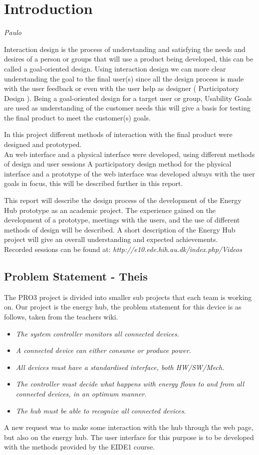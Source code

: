 \chapter{Introduction}

\textit{Paulo}

Interaction design is the process of understanding and satisfying the needs and desires of a person or groups that will use a product being developed, this can be called a goal-oriented design. Using interaction design we can more clear understanding the goal to the final user(s) since all the design process is made with the user feedback or even with the user help as designer ( Participatory Design ). Being a goal-oriented design for a target user or group, Usability Goals are used as understanding of the customer needs this will give a basis for testing the final product to meet the customer(s) goals.

In this project different methods of interaction with the final product were designed and prototyped.\\
An web interface and a physical interface were developed, using different methods of design and user sessions A participatory design method for the physical interface and a prototype of the web interface was developed always with the user goals in focus, this will be described further in this report.

This report will describe the design process of the development of the Energy Hub prototype as an academic project. The experience gained on the development of a prototype, meetings with the users, and the use of different methods of design will be described. A short description of the Energy Hub project will give an overall understanding and expected achievements.\\

Recorded sessions can be found at: \textit{http://e10.ede.hih.au.dk/index.php/Videos}
\section{Problem Statement - Theis}
The PRO3 project is divided into smaller sub projects that each team is working on. Our project is the energy hub, the problem statement for this device is as follows, taken from the teachers wiki.
\begin{itemize}
	\item\textit{The system controller monitors all connected devices.}
	\item\textit{A connected device can either consume or produce power.}
	\item\textit{All devices must have a standardised interface, both HW/SW/Mech.}
	\item\textit{The controller must decide what happens with energy flows to and from all connected devices, in an optimum manner.}
	\item\textit{The hub must be able to recognize all connected devices.}
\end{itemize}
A new request was to make some interaction with the hub through the web page, but also on the energy hub. The user interface for this purpose is to be developed with the methods provided by the EIDE1 course.


